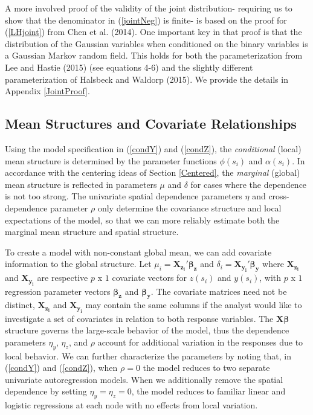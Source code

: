 \documentclass[12pt, a4paper, twoside]{article}
\begin{document}
A more involved proof of the validity of the joint distribution- requiring us to show that the denominator in (\ref{jointNeg}) is finite- is based on the proof for (\ref{LHjoint}) from Chen et al. (2014). One important key in that proof is that the distribution of the Gaussian variables when conditioned on the binary variables is a Gaussian Markov random field. This holds for both the parameterization from Lee and Hastie (2015) (see equations 4-6) and the slightly different parameterization of Halsbeck and Waldorp (2015). We provide the details in Appendix \ref{JointProof}.


\subsection{Mean Structures and Covariate Relationships} \label{ModelProp}
Using the model specification in (\ref{condY}) and (\ref{condZ}), the \textit{conditional} (local) mean structure is determined by the parameter functions $\phi(s_i)$ and $\alpha(s_i)$. In accordance with the centering ideas of Section \ref{Centered}, the \textit{marginal} (global) mean structure is reflected in parameters $\mu$ and $\delta$ for cases where the dependence is not too strong. The univariate spatial dependence parameters $\eta$ and cross-dependence parameter $\rho$ only determine the covariance structure and local expectations of the model, so that we can more reliably estimate both the marginal mean structure and spatial structure.

To create a model with non-constant global mean, we can add covariate information to the global structure. Let $\mu_i = \boldsymbol{X_{z_i}'\beta_z}$ and $\delta_i = \boldsymbol{X_{y_i}'\beta_y}$ where $\boldsymbol{X_{z_i}}$ and $\boldsymbol{X_{y_i}}$ are respective $p$ x $1$ covariate vectors for $z(s_i)$ and $y(s_i)$,  with $p$ x $1$ regression parameter vectors $\boldsymbol{\beta_z}$ and $\boldsymbol{\beta_y}$. The covariate matrices need not be distinct, $\boldsymbol{X_{z_i}}$ and $\boldsymbol{X_{y_i}}$ may contain the same columns if the analyst would like to investigate a set of covariates in relation to both response variables. The $\boldsymbol{X\beta}$ structure governs the large-scale behavior of the model, thus the dependence parameters $\eta_y$, $\eta_z$, and $\rho$ account for additional variation in the responses due to local behavior. We can further characterize the parameters by noting that, in (\ref{condY}) and (\ref{condZ}), when $\rho=0$ the model reduces to two separate univariate autoregression models. When we additionally remove the spatial dependence by setting $\eta_{y}=\eta_z=0$, the model reduces to familiar linear and logistic regressions at each node with no effects from local variation.
\end{document}
